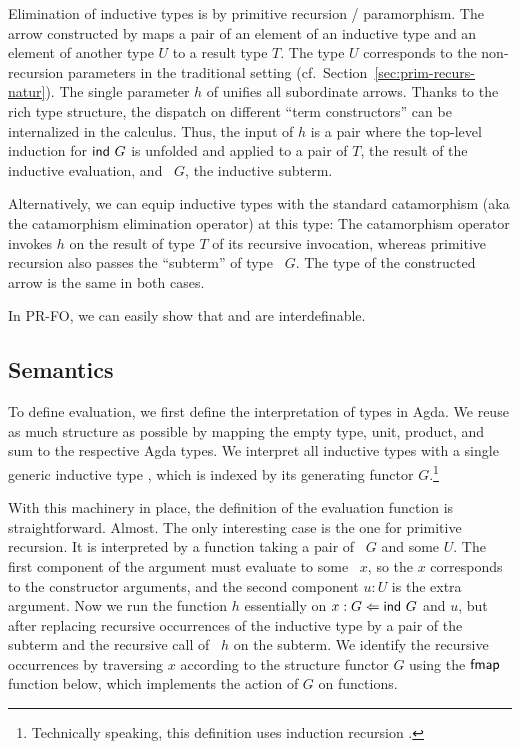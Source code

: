 \documentclass[a4paper,USenglish,cleveref, autoref, thm-restate]{lipics-v2021}
\begin{document}
Elimination of inductive types is by primitive recursion /
paramorphism. The arrow constructed by {\AP} maps a pair of an element
of an inductive type and an element of another type $U$ to a result type
$T$. The type $U$ corresponds to the non-recursion parameters in the
traditional setting (cf.\ Section~\ref{sec:prim-recurs-natur}). 
The single parameter $h$ of {\AP} unifies all subordinate
arrows. Thanks to the rich type structure, the dispatch on different
``term constructors'' can be internalized in the calculus. Thus, the
input of $h$ is a pair where the top-level induction for $\Aind\ G$ is
unfolded and applied to a pair of $T$, the result of the inductive
evaluation, and \Aind~$G$, the inductive subterm.

Alternatively, we can equip inductive types with the standard
catamorphism (aka the catamorphism elimination operator) at this type:
\ccDataPRF
The catamorphism operator invokes $h$ on the result of type $T$ of its
recursive invocation, whereas primitive recursion also passes the
``subterm'' of type \Aind~$G$. The type of the constructed arrow is
the same in both cases.

In PR-FO, we can easily show that {\AP} and {\ACt} are interdefinable.

\subsection{Semantics}
\label{sec:semantics}


To define evaluation, we first define the interpretation of types in Agda.
\ccDataAlg
We reuse as much structure as possible by mapping the empty type, unit, product, and
sum to the respective Agda types. We interpret all inductive types with a
single generic inductive type , which is indexed by its generating
functor $G$.\footnote{Technically speaking, this definition uses
  induction recursion \cite{DBLP:journals/apal/DybjerS03}.}

With this machinery in place, the definition of the evaluation
function is straightforward. Almost.
\ccFunEval
The only interesting case is the one for primitive recursion. It is
interpreted by a function taking a pair of \Aind~$G$ and some $U$. The
first component of the argument must evaluate to some \Acon~$x$, so the $x$ corresponds
to the constructor arguments, and the second component $u:U$ is the
extra argument. Now we run the function $h$ essentially on
$x :{} G \Leftarrow \Aind~G$ and $u$, but 
after replacing recursive occurrences of the inductive type by a pair
of the subterm and the recursive call of {\AP}~$h$ on the subterm. We
identify the recursive occurrences by traversing $x$ according to the
structure functor $G$ using the $\Afmap$ function below, which
implements the action of $G$ on functions. 
\ccFunFmapSignature
\vspace{-1.5\baselineskip}
\ccFunFmap
\end{document}
